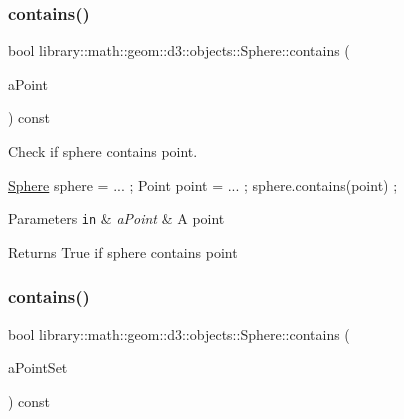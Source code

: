 \subsubsection{\texorpdfstring{contains()}{contains()}\hspace{0.1cm}{\footnotesize\ttfamily [1/2]}}
{\footnotesize\ttfamily bool library\+::math\+::geom\+::d3\+::objects\+::\+Sphere\+::contains (\begin{DoxyParamCaption}\item[{const \hyperlink{classlibrary_1_1math_1_1geom_1_1d3_1_1objects_1_1_point}{Point} \&}]{a\+Point }\end{DoxyParamCaption}) const}



Check if sphere contains point. 


\begin{DoxyCode}
\hyperlink{classlibrary_1_1math_1_1geom_1_1d3_1_1objects_1_1_sphere_a55dccc8ea16ee55cd7694c26afa8ea39}{Sphere} sphere = ... ;
Point point = ... ;
sphere.contains(point) ;
\end{DoxyCode}



\begin{DoxyParams}[1]{Parameters}
\mbox{\tt in}  & {\em a\+Point} & A point \\
\hline
\end{DoxyParams}
\begin{DoxyReturn}{Returns}
True if sphere contains point 
\end{DoxyReturn}
\mbox{\label{classlibrary_1_1math_1_1geom_1_1d3_1_1objects_1_1_sphere_a75120c9d3ff75cd389ae9ccb98a4218b}} 
\subsubsection{\texorpdfstring{contains()}{contains()}\hspace{0.1cm}{\footnotesize\ttfamily [2/2]}}
{\footnotesize\ttfamily bool library\+::math\+::geom\+::d3\+::objects\+::\+Sphere\+::contains (\begin{DoxyParamCaption}\item[{const \hyperlink{classlibrary_1_1math_1_1geom_1_1d3_1_1objects_1_1_point_set}{Point\+Set} \&}]{a\+Point\+Set }\end{DoxyParamCaption}) const}



